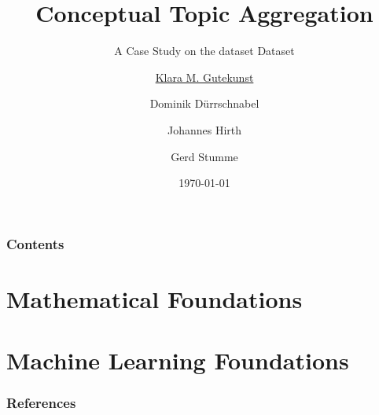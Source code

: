 \documentclass[10pt]{beamer}
\title[\university{}]{Conceptual Topic Aggregation}
\subtitle{A Case Study on the \acs{dataset} Dataset}
\author[Klara M. Gutekunst]{\underline{Klara M. Gutekunst} \and Dominik Dürrschnabel \and Johannes Hirth \and Gerd Stumme}
\institute[klara.gutekunst@uni-kassel.de]{\university{}}
\date[\today]
{\today}
\begin{document}

\frame{\titlepage}
\begin{frame}
\frametitle{Contents}
\tableofcontents
\end{frame}



\section{Mathematical Foundations}



\section{Machine Learning Foundations}










\begin{frame}[allowframebreaks]
\frametitle{References}
\printbibliography
\end{frame}



\end{document}
